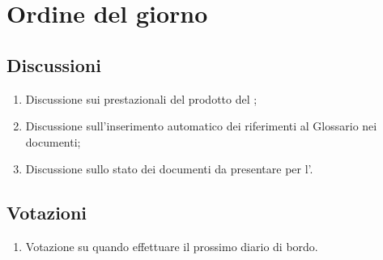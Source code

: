 \section{Ordine del giorno} \label{sec:agenda}
\subsection{Discussioni} \label{subsec:discussione}
\begin{enumerate}
    \item Discussione sui  prestazionali del prodotto del ;
    \item Discussione sull'inserimento automatico dei riferimenti al Glossario nei documenti;
    \item Discussione sullo stato dei documenti da presentare per l'.
\end{enumerate}

\subsection{Votazioni} \label{subsec:votazione}
\begin{enumerate}
    \item Votazione su quando effettuare il prossimo diario di bordo.
\end{enumerate}